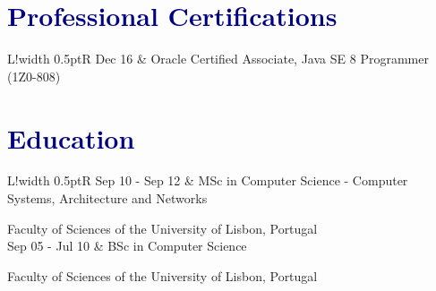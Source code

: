 \documentclass[10pt]{article}
\newcommand\VRule{\color{lightgray}\vrule width 0.5pt}
\begin{document}
\vspace{-4mm}
\section*{\textcolor{navy}{\large{Professional Certifications}}}
\vspace{-2mm}
\begin{tabular}{L!{\VRule}R}
    \footnotesize{Dec 16}
     &
    \small{Oracle Certified Associate, Java SE 8 Programmer}
    (\footnotesize{1Z0-808})
\end{tabular}

\vspace{-4mm}
\section*{\textcolor{navy}{\large{Education}}}
\vspace{-1mm}
\begin{tabular}{L!{\VRule}R}
    \footnotesize{Sep 10 - Sep 12}
     &
    \small{MSc in Computer Science - Computer Systems, Architecture and Networks}

    \footnotesize{Faculty of Sciences of the University of Lisbon, Portugal}
    \\
    \footnotesize{Sep 05 - Jul 10}
     &
    \small{BSc in Computer Science}

    \footnotesize{Faculty of Sciences of the University of Lisbon, Portugal}
\end{tabular}

\vspace{-2mm}
\end{document}
